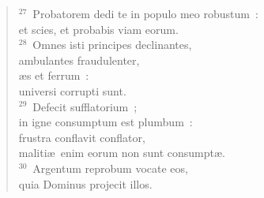 \begin{flushleft}
\begin{verse}
${}^{27}$~Probatorem dedi te in populo meo robustum~:\\ et scies, et probabis viam eorum.\\
${}^{28}$~Omnes isti principes declinantes,\\ ambulantes fraudulenter,\\ \ae s et ferrum~:\\ universi corrupti sunt.\\
${}^{29}$~Defecit sufflatorium~;\\ in igne consumptum est plumbum~:\\ frustra conflavit conflator,\\ maliti\ae\ enim eorum non sunt consumpt\ae .\\
${}^{30}$~Argentum reprobum vocate eos,\\ quia Dominus projecit illos.\end{verse}\end{flushleft}



